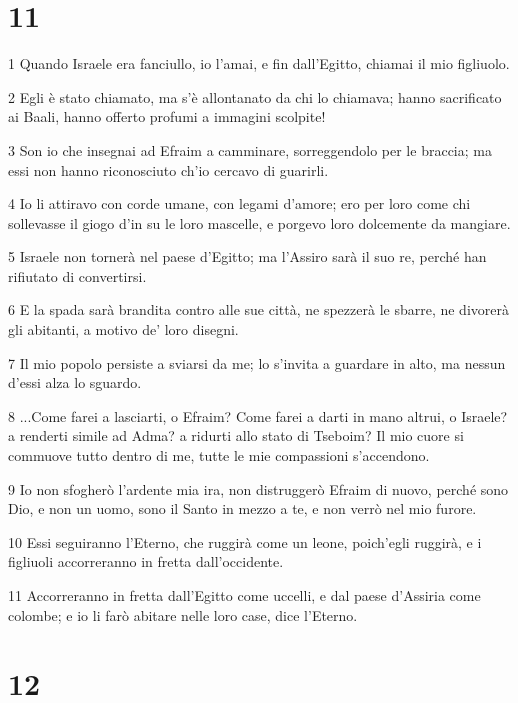 \chapter{11}

\par 1 Quando Israele era fanciullo, io l'amai, e fin dall'Egitto, chiamai il mio figliuolo.
\par 2 Egli è stato chiamato, ma s'è allontanato da chi lo chiamava; hanno sacrificato ai Baali, hanno offerto profumi a immagini scolpite!
\par 3 Son io che insegnai ad Efraim a camminare, sorreggendolo per le braccia; ma essi non hanno riconosciuto ch'io cercavo di guarirli.
\par 4 Io li attiravo con corde umane, con legami d'amore; ero per loro come chi sollevasse il giogo d'in su le loro mascelle, e porgevo loro dolcemente da mangiare.
\par 5 Israele non tornerà nel paese d'Egitto; ma l'Assiro sarà il suo re, perché han rifiutato di convertirsi.
\par 6 E la spada sarà brandita contro alle sue città, ne spezzerà le sbarre, ne divorerà gli abitanti, a motivo de' loro disegni.
\par 7 Il mio popolo persiste a sviarsi da me; lo s'invita a guardare in alto, ma nessun d'essi alza lo sguardo.
\par 8 ...Come farei a lasciarti, o Efraim? Come farei a darti in mano altrui, o Israele? a renderti simile ad Adma? a ridurti allo stato di Tseboim? Il mio cuore si commuove tutto dentro di me, tutte le mie compassioni s'accendono.
\par 9 Io non sfogherò l'ardente mia ira, non distruggerò Efraim di nuovo, perché sono Dio, e non un uomo, sono il Santo in mezzo a te, e non verrò nel mio furore.
\par 10 Essi seguiranno l'Eterno, che ruggirà come un leone, poich'egli ruggirà, e i figliuoli accorreranno in fretta dall'occidente.
\par 11 Accorreranno in fretta dall'Egitto come uccelli, e dal paese d'Assiria come colombe; e io li farò abitare nelle loro case, dice l'Eterno.

\chapter{12}

